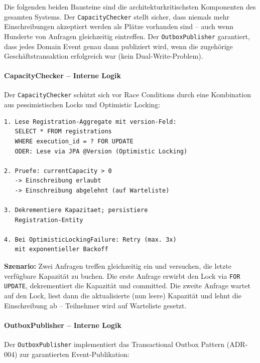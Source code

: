 Die folgenden beiden Bausteine sind die architekturkritischsten
Komponenten des gesamten Systems. Der \texttt{CapacityChecker}
stellt sicher, dass niemals mehr Einschreibungen akzeptiert
werden als Plätze vorhanden sind -- auch wenn Hunderte von
Anfragen gleichzeitig eintreffen. Der \texttt{OutboxPublisher}
garantiert, dass jedes Domain Event genau dann publiziert wird,
wenn die zugehörige Geschäftstransaktion erfolgreich war
(kein Dual-Write-Problem).

\paragraph{CapacityChecker -- Interne Logik}

Der \texttt{CapacityChecker} schützt sich vor Race Conditions
durch eine Kombination aus pessimistischen Locks und Optimistic
Locking:

\begin{lstlisting}
1. Lese Registration-Aggregate mit version-Feld:
   SELECT * FROM registrations
   WHERE execution_id = ? FOR UPDATE
   ODER: Lese via JPA @Version (Optimistic Locking)

2. Pruefe: currentCapacity > 0
   -> Einschreibung erlaubt
   -> Einschreibung abgelehnt (auf Warteliste)

3. Dekrementiere Kapazitaet; persistiere
   Registration-Entity

4. Bei OptimisticLockingFailure: Retry (max. 3x)
   mit exponentieller Backoff
\end{lstlisting}

\textbf{Szenario:} Zwei Anfragen treffen gleichzeitig ein und
versuchen, die letzte verfügbare Kapazität zu buchen. Die erste
Anfrage erwirbt den Lock via \texttt{FOR UPDATE}, dekrementiert
die Kapazität und committed. Die zweite Anfrage wartet auf den
Lock, liest dann die aktualisierte (nun leere) Kapazität und
lehnt die Einschreibung ab -- Teilnehmer wird auf Warteliste
gesetzt.

\paragraph{OutboxPublisher -- Interne Logik}

Der \texttt{OutboxPublisher} implementiert das Transactional
Outbox Pattern (ADR-004) zur garantierten Event-Publikation:

